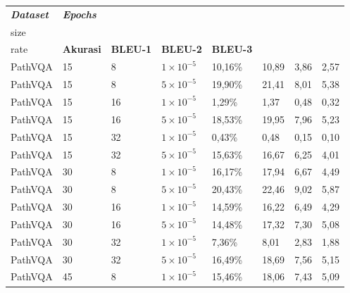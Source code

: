 
\begin{longtable}[c]{|l|l|l|l|l|l|l|l|}
  \hline
  \textit{\textbf{Dataset}} &
    \textit{\textbf{Epochs}} &
    \textit{\textbf{\begin{tabular}[c]{@{}l@{}}Batch \\ size\end{tabular}}} &
    \textit{\textbf{\begin{tabular}[c]{@{}l@{}}Learning \\ rate\end{tabular}}} &
    \textbf{Akurasi} &
    \textbf{BLEU-1} &
    \textbf{BLEU-2} &
    \textbf{BLEU-3} \\ \hline
  \endfirsthead
  \endhead
  PathVQA & 15 & 8  & $1 \times 10^{-5}$ & 10,16\% & 10,89 & 3,86  & 2,57  \\ \hline
  PathVQA & 15 & 8  & $5 \times 10^{-5}$ & 19,90\% & 21,41 & 8,01  & 5,38  \\ \hline
  PathVQA & 15 & 16 & $1 \times 10^{-5}$ & 1,29\%  & 1,37  & 0,48  & 0,32  \\ \hline
  PathVQA & 15 & 16 & $5 \times 10^{-5}$ & 18,53\% & 19,95 & 7,96  & 5,23  \\ \hline
  PathVQA & 15 & 32 & $1 \times 10^{-5}$ & 0,43\%  & 0,48  & 0,15  & 0,10  \\ \hline
  PathVQA & 15 & 32 & $5 \times 10^{-5}$ & 15,63\% & 16,67 & 6,25  & 4,01  \\ \hline
  PathVQA & 30 & 8  & $1 \times 10^{-5}$ & 16,17\% & 17,94 & 6,67  & 4,49  \\ \hline
  PathVQA & 30 & 8  & $5 \times 10^{-5}$ & 20,43\% & 22,46 & 9,02  & 5,87  \\ \hline
  PathVQA & 30 & 16 & $1 \times 10^{-5}$ & 14,59\% & 16,22 & 6,49  & 4,29  \\ \hline
  PathVQA & 30 & 16 & $5 \times 10^{-5}$ & 14,48\% & 17,32 & 7,30  & 5,08  \\ \hline
  PathVQA & 30 & 32 & $1 \times 10^{-5}$ & 7,36\%  & 8,01  & 2,83  & 1,88  \\ \hline
  PathVQA & 30 & 32 & $5 \times 10^{-5}$ & 16,49\% & 18,69 & 7,56  & 5,15  \\ \hline
  PathVQA & 45 & 8  & $1 \times 10^{-5}$ & 15,46\% & 18,06 & 7,43  & 5,09  \\ \hline

\end{longtable}
